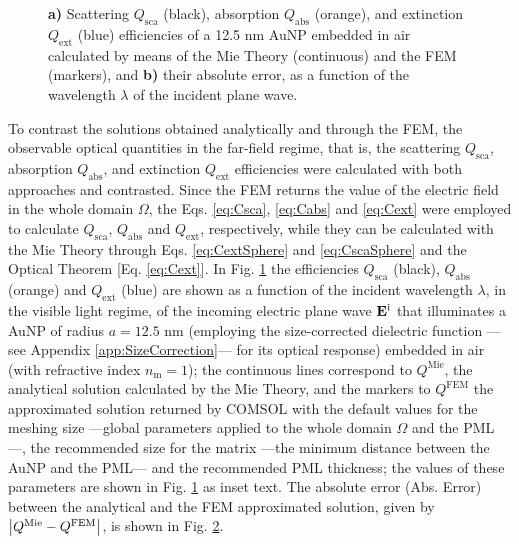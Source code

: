 \begin{figure}[b!]
 \def\svgwidth{.9\textwidth}
 \small
 \centering
    \hspace*{-.72\textwidth}
     \begin{subfigure}{\textwidth}\caption{}\label{fig:Eff:First:a}\end{subfigure}\\[11em]
    \hspace*{-.72\textwidth}
     \begin{subfigure}{\textwidth}\caption{}\label{fig:Eff:First:b}\end{subfigure}\\[-14.5em]
\caption[Scattering, Absorption and Extinction Efficiencies of a 12.5 nm AuNP$@$Air: Analytical and FEM solutions with no optimization]{\textbf{a)} Scattering $Q_\text{sca}$ (black), absorption $Q_\text{abs}$ (orange), and extinction $Q_\text{ext}$ (blue) efficiencies of a 12.5 nm AuNP embedded in air calculated by means of the Mie Theory (continuous) and the FEM (markers), and \textbf{b)} their absolute error, as a function of the wavelength $\lambda$ of the incident plane wave.}
\label{fig:Eff:First}
\end{figure}
%

To contrast the solutions obtained analytically and through the FEM, the observable optical quantities in the far-field regime, that is, the scattering $Q_\text{sca}$, absorption $Q_\text{abs}$,  and extinction $Q_\text{ext}$ efficiencies were calculated with both approaches and contrasted. Since the FEM returns the value of the electric field in the whole domain $\Omega$, the Eqs. \eqref{eq:Csca}, \eqref{eq:Cabs} and \eqref{eq:Cext} were employed to calculate $Q_\text{sca}$, $Q_\text{abs}$ and $Q_\text{ext}$, respectively, while they can be calculated with the Mie Theory through Eqs. \eqref{eq:CextSphere} and \eqref{eq:CscaSphere} and the Optical Theorem [Eq. \eqref{eq:Cext}]. In Fig. \ref{fig:Eff:First:a} the efficiencies  $Q_\text{sca}$ (black),  $Q_\text{abs}$ (orange) and $Q_\text{ext}$ (blue) are shown as a function of the incident wavelength $\lambda$, in the visible light regime,  of the incoming electric plane wave $\vb{E}^\text{i}$ that illuminates a AuNP of radius $a = 12.5$ nm (employing the size-corrected dielectric function ---see Appendix \ref{app:SizeCorrection}--- for its optical response) embedded in air (with refractive index $n_\text{m} = 1$); the continuous lines correspond to $Q^\text{Mie}$, the analytical solution calculated by the Mie Theory, and the markers to $Q^\text{FEM}$ the approximated solution returned by COMSOL with the default values for the meshing size ---global parameters applied to the whole domain $\Omega$ and the PML---, the recommended size for the matrix ---the minimum distance between the AuNP and the PML--- and the recommended PML thickness; the values of these parameters are shown in Fig. \ref{fig:Eff:First:a} as inset text. The absolute error (Abs. Error) between the analytical and the FEM  approximated solution, given by $\abs{Q^\text{Mie}-Q^\text{FEM}}$, is shown in Fig. \ref{fig:Eff:First:b}.

